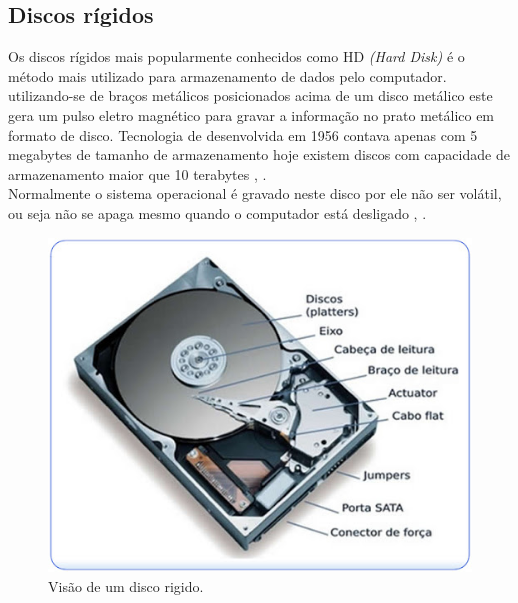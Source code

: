 \subsection{Discos rígidos}
\label{subsection:Discos}
Os discos rígidos mais popularmente conhecidos como HD \emph{(Hard Disk)} é o método mais utilizado para armazenamento de dados pelo computador. utilizando-se de braços metálicos posicionados acima de um disco metálico este gera um pulso eletro magnético para gravar a informação no prato metálico em formato de disco. Tecnologia de desenvolvida em 1956 contava apenas com 5 megabytes de tamanho de armazenamento hoje existem discos com capacidade de armazenamento maior que 10 terabytes \cite{Tanenbaum2016}, \cite{Comer2012}.\\
Normalmente o sistema operacional é gravado  neste disco por ele não ser volátil, ou seja não se apaga mesmo quando o computador está desligado \cite{Tanenbaum2016}, \cite{Comer2012}.
\begin{figure}[htpb]
    \centering
   \includegraphics[scale=0.5]{imagens/disco.jpg}
   \caption{Visão de um disco rigido.}
   \label{fig:disco}
\end{figure}